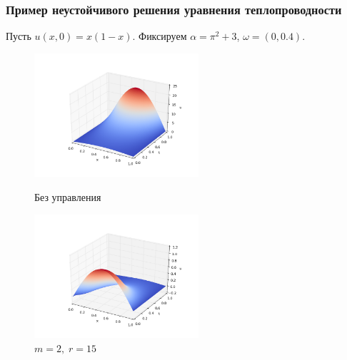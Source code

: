 \documentclass{beamer}
\begin{document}
\begin{frame}
\frametitle{Пример неустойчивого решения уравнения теплопроводности}

Пусть $u(x, 0) = x(1 - x)$. Фиксируем $\alpha = \pi^2 + 3$, $\omega = (0, 0.4)$.


\begin{figure}[H]
\centering
\begin{minipage}{.5\textwidth}
  \centering
  \includegraphics[width=2.4in]{par_ex_pi3}
  \caption{Без управления}
  \label{fig:test1}
\end{minipage}%
\begin{minipage}{.5\textwidth}
  \centering
  \includegraphics[width=2.4in]{par_re_pi3}
  \caption{$m = 2,\; r = 15$}
  \label{fig:test2}
\end{minipage}
\end{figure}

\end{frame}
\end{document}
